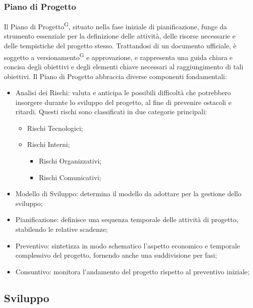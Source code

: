 \documentclass[5pt]{article}
\begin{document}
\subsubsection{Piano di Progetto}
Il Piano di Progetto\textsuperscript{G}, situato nella fase iniziale di pianificazione, funge da strumento essenziale per la definizione delle attività, delle risorse necessarie e delle tempistiche del progetto stesso. Trattandosi di un documento ufficiale, è soggetto a versionamento\textsuperscript{G} e approvazione, e rappresenta una guida chiara e concisa degli obiettivi e degli elementi chiave necessari al raggiungimento di tali obiettivi.
Il Piano di Progetto abbraccia diverse componenti fondamentali:
\begin{itemize}
    \item Analisi dei Rischi: valuta e anticipa le possibili difficoltà che potrebbero insorgere durante lo sviluppo del progetto, al fine di prevenire ostacoli e ritardi. Questi rischi sono classificati in due categorie principali:
    \begin{itemize}
        \item Rischi Tecnologici;
        \item Rischi Interni;
        \begin{itemize}
            \item Rischi Organizzativi;
            \item Rischi Comunicativi;
        \end{itemize}
    \end{itemize}
    \item Modello di Sviluppo: determina il modello da adottare per la gestione dello sviluppo;
    \item Pianificazione: definisce una sequenza temporale delle attività di progetto, stabilendo le relative scadenze;
    \item Preventivo: sintetizza in modo schematico l'aspetto economico e temporale complessivo del progetto, fornendo anche una suddivisione per fasi;
    \item Consuntivo: monitora l'andamento del progetto rispetto al preventivo iniziale;
\end{itemize}


\subsection{Sviluppo}
\end{document}
